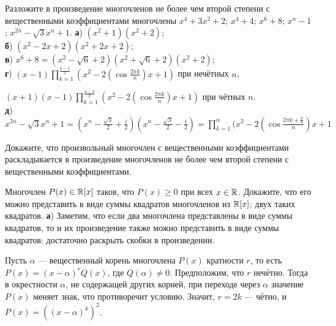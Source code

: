 \documentclass[a4paper, 12pt]{article}
\begin{document}











 Разложите в произведение многочленов не более чем второй
степени с вещественными коэффициентами многочлены
 $x^4+3x^2+2$;
 $x^4+4$;
 $x^6+8$;
 $x^n-1$;
 $x^{2n}-\sqrt3x^n+1$.
\textbf{а}) $(x^2+1)(x^2+2)$;\\
\textbf{б}) $(x^2-2x+2)(x^2+2x+2)$;\\
\textbf{в}) $x^6+8 = (x^2-\sqrt6+2)(x^2+\sqrt6+2)(x^2+2)$;\\
\textbf{г}) $(x-1)\prod_{k=1}^{\frac{n-1}{2}} (x^2-2(\cos\frac{2 \pi k}{n})x+1)$ при нечётных $n$,

$(x+1)(x-1)\prod_{k=1}^{\frac{n-2}{2}} (x^2-2(\cos\frac{2 \pi k}{n})x+1)$ при чётных $n$. \\

\textbf{д}) $x^{2n}-\sqrt3x^n+1 = (x^n-\frac{\sqrt3}{2}+\frac{i}{2})(x^n-\frac{\sqrt3}{2}-\frac{i}{2}) = \prod_{k=1}^n(x^2-2 (\cos \frac{2\pi k+\frac{\pi}{6}}{n})x+1$












Докажите, что произвольный
многочлен  с вещественными
коэффициентами раскладывается в произведение многочленов не более чем
второй степени с вещественными коэффициентами.












 Многочлен $P(x)\in\mathbb{R}[x]$ таков, что $P(x)\geq0$ при всех $x\in\mathbb{R}$. Докажите, что его можно представить в виде
суммы  квадратов многочленов из $\mathbb{R}[x]$;  двух таких квадратов.
\textbf{а}) Заметим, что если два многочлена представлены в виде суммы квадратов, то и их произведение также можно представить в виде суммы квадратов: достаточно раскрыть скобки в произведении.

Пусть $\alpha$ --- вещественный корень многочлена $P(x)$ кратности $r$, то есть $P(x) = (x-\alpha)^r Q(x)$, где $Q(\alpha)\neq 0$. Предположим, что $r$ нечётно. Тогда в окрестности $\alpha$, не содержащей других корней, при переходе через $\alpha$ значение $P(x)$ меняет знак, что противоречит условию. Значит, $r=2k$ --- чётно, и $P(x) = ((x-\alpha)^k)^2$.
\end{document}
